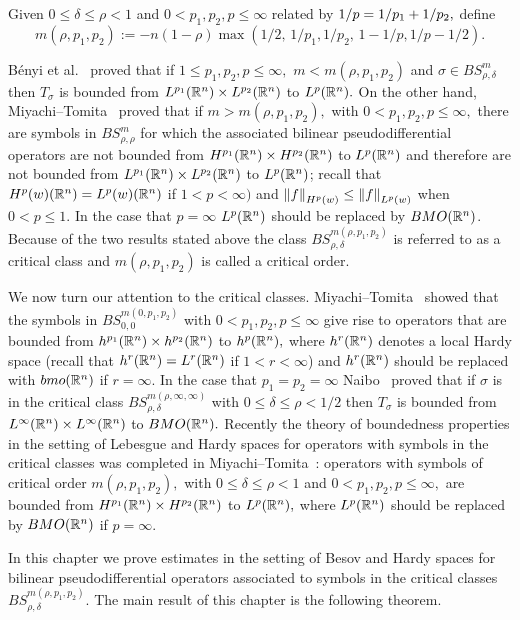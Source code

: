Given  $0\le \delta\le \rho< 1$  and $0< p_1,p_2,p\le \infty$  related   by $1/p=1/p_1+1/p_2,$ define 
$$
m(\rho, p_1,p_2):=-n(1-\rho)\max({1}/{2},\,{1}/{p_1},{1}/{p_2},\, 1-1/p, 1/p-1/2).
$$ 

B\'enyi et al.~\cite{MR3205530} proved that if $1\le p_1,p_2, p\le \infty,$    $m<m(\rho,p_1,p_2)$ and $\sigma\in BS^m_{\rho,\delta}$  then $T_\sigma$ is bounded from $L^{p_1}({{\mathbb R}^n})\times L^{p_2}({{\mathbb R}^n})$ to $L^p({{\mathbb R}^n}).$  On the other hand, Miyachi--Tomita~\cite{MR3179688} proved that  if $m>m(\rho, p_1,p_2),$ with $0< p_1,p_2,p\le \infty,$ there are symbols in $BS^m_{\rho,\rho}$ for which the associated  bilinear pseudodifferential operators are not bounded from $H^{p_1}({{\mathbb R}^n})\times H^{p_2}({{\mathbb R}^n})$ to $L^p({{\mathbb R}^n})$ and therefore are not bounded from $L^{p_1}({{\mathbb R}^n})\times L^{p_2}({{\mathbb R}^n})$ to $L^p({{\mathbb R}^n})$; recall that $H^{p}(w)({{\mathbb R}^n})=L^p(w)({{\mathbb R}^n})$ if $1<p<\infty)$ and $\left\|f\right\|_{H^p(w)} \leq \left\|f\right\|_{L^p(w)}$ when $0<p\leq 1$. In the case that $p=\infty$ $L^p({{\mathbb R}^n})$ should be replaced by $BMO({{\mathbb R}^n})$. Because of the two results stated above the class $BS^{m(\rho,p_1,p_2)}_{\rho,\delta}$ is referred to as a critical class and $m(\rho,p_1,p_2)$ is called a critical order. 

We now turn our attention to the critical classes. Miyachi--Tomita~\cite{MR3179688} showed that the symbols in $BS^{m(0,p_1,p_2)}_{0,0}$ with $0<p_1,p_2,p\le  \infty $ give rise to operators that are bounded from  $h^{p_1}({{\mathbb R}^n})\times h^{p_2}({{\mathbb R}^n})$ to $h^p({{\mathbb R}^n}),$ where $h^{r}({{\mathbb R}^n})$ denotes a local Hardy space (recall that $h^{r}({{\mathbb R}^n})=L^r({{\mathbb R}^n})$ if $1<r<\infty$)  and $h^{r}({{\mathbb R}^n})$ should be replaced with $bmo({{\mathbb R}^n})$ if $r=\infty.$   In the case that $p_1 = p_2 = \infty$ Naibo~\cite{MR3411149}  proved  that if $\sigma$ is in the critical class $BS^{m(\rho, \infty,\infty)}_{\rho,\delta}$ with $0\le \delta\le \rho<1/2 $ then $T_\sigma$ is bounded from $L^{\infty}({{\mathbb R}^n})\times L^{\infty}({{\mathbb R}^n})$ to $BMO({{\mathbb R}^n}).$ Recently the theory of boundedness properties in the setting of Lebesgue and  Hardy  spaces for operators with symbols in the critical classes was completed in Miyachi--Tomita~\cite{MT1, MT2}: operators with symbols of critical order $ m(\rho, p_1,p_2),$ with $0\le \delta\le \rho<1$  and $0< p_1,p_2,p\le \infty,$ are bounded from $H^{p_1}({{\mathbb R}^n})\times H^{p_2}({{\mathbb R}^n})$ to $L^p({{\mathbb R}^n}),$ where  $L^p({{\mathbb R}^n})$ should be replaced by $BMO({{\mathbb R}^n})$ if $p=\infty.$

In this chapter we prove estimates in the setting of Besov and Hardy spaces for bilinear pseudodifferential operators associated to symbols in the critical classes $BS^{m(\rho,p_1,p_2)}_{\rho,\delta}$. The main result of this chapter is the following theorem.

